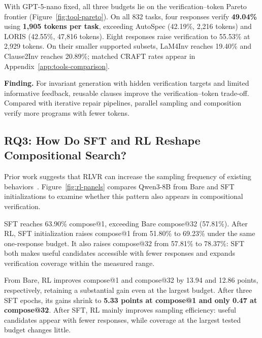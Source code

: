 With GPT-5-nano fixed, all three \sam{} budgets lie on the verification--token
Pareto frontier (Figure~\ref{fig:tool-pareto}). On all 832 tasks, four
responses verify \textbf{49.04\%} using \textbf{1,905 tokens per task},
exceeding AutoSpec (42.19\%, 2,216 tokens) and LORIS (42.55\%, 47,816 tokens).
Eight responses raise verification to 55.53\% at 2,929 tokens. On their
smaller supported subsets, LaM4Inv reaches 19.40\% and Clause2Inv reaches
20.89\%; matched CRAFT rates appear in Appendix~\ref{app:tools-comparison}.

\begin{insightbox}
\textbf{Finding.}
For invariant generation with hidden verification targets and limited
informative feedback, reusable clauses improve the verification--token
trade-off. Compared with iterative repair pipelines, parallel sampling and
composition verify more programs with fewer tokens.
\end{insightbox}

\subsection{RQ3: How Do SFT and RL Reshape Compositional Search?}
\label{sec:exp:rl}

Prior work suggests that RLVR can increase the sampling frequency of existing
behaviors~\citep{yue2025rlcapacity}.
Figure~\ref{fig:rl-panels} compares Qwen3-8B from Bare and SFT initializations
to examine whether this pattern also appears in compositional verification.

SFT reaches 63.90\% compose@1, exceeding Bare compose@32 (57.81\%).
After RL, SFT initialization raises compose@1 from 51.80\% to 69.23\%
under the same one-response budget.
It also raises compose@32 from 57.81\% to 78.37\%: SFT both makes
useful candidates accessible with fewer responses and expands verification
coverage within the measured range.

From Bare, RL improves compose@1 and compose@32 by 13.94 and 12.86
points, respectively, retaining a substantial gain even at the largest budget.
After three SFT epochs, its gains shrink to \textbf{5.33 points at compose@1
and only 0.47 at compose@32}.  After SFT, RL mainly improves sampling
efficiency: useful candidates appear with fewer responses, while
coverage at the largest tested budget changes little.


